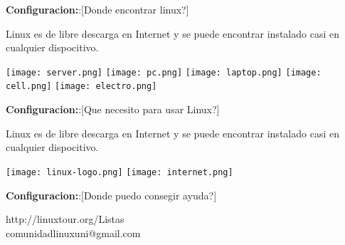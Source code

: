 \documentclass[xcolor=svgnames]{beamer}
\begin{document}
	\begin{frame}
				
		\begin{block}{\textbf{Configuracion:}:[Donde encontrar linux?]}
						
			Linux es de libre descarga en Internet y se puede encontrar instalado casi en cualquier dispocitivo.
			
			\texttt{[image: server.png]}
			\texttt{[image: pc.png]}
			\texttt{[image: laptop.png]}
			\texttt{[image: cell.png]}
			\texttt{[image: electro.png]}
			
		\end{block}
	
		\begin{block}{\textbf{Configuracion:}:[Que necesito para usar Linux?]}
						
			Linux es de libre descarga en Internet y se puede encontrar instalado casi en cualquier dispocitivo.
			
			\texttt{[image: linux-logo.png]}
			\texttt{[image: internet.png]}
		
		\end{block}
			
		\begin{block}{\textbf{Configuracion:}:[Donde puedo consegir ayuda?]}
			
			http://linuxtour.org/Listas  \\
			comunidadlinuxuni@gmail.com
			
		\end{block}
			
	\end{frame}
	
\end{document}
